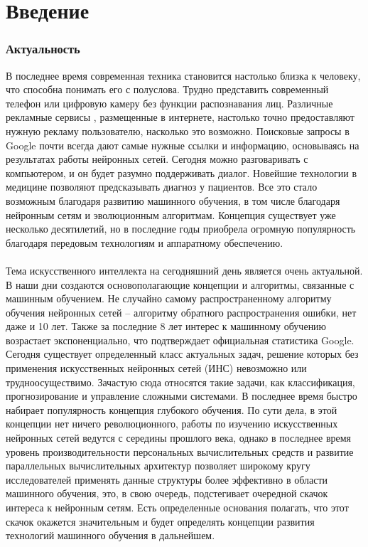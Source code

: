 \newpage

\chapter*{Введение}
\subsection*{Актуальность}
В последнее время современная техника становится настолько
близка к человеку, что способна понимать его с полуслова.
Трудно представить современный телефон или цифровую камеру
 без функции распознавания лиц. Различные рекламные сервисы
, размещенные в интернете, настолько точно предоставляют
нужную рекламу пользователю, насколько это возможно.  
Поисковые запросы в Google почти всегда дают самые нужные
 ссылки и информацию, основываясь на результатах работы нейронных 
 сетей. Сегодня можно разговаривать с компьютером, и он будет 
 разумно поддерживать диалог. Новейшие технологии в медицине 
 позволяют предсказывать диагноз у пациентов. Все это стало 
 возможным благодаря развитию машинного обучения, в том числе
  благодаря нейронным сетям и эволюционным алгоритмам. 
  Концепция существует уже несколько десятилетий, но в 
  последние годы приобрела огромную популярность благодаря
 передовым технологиям и аппаратному обеспечению. \\ \\
Тема искусственного интеллекта на сегодняшний день является 
очень актуальной. В наши дни создаются основополагающие 
концепции и алгоритмы, связанные с машинным обучением. 
Не случайно самому распространенному алгоритму обучения 
нейронных сетей – алгоритму обратного распространения 
ошибки, нет даже и 10 лет. Также за последние 8 лет интерес 
к машинному обучению возрастает экспоненциально, 
что подтверждает официальная статистика Google. 
Сегодня существует определенный класс актуальных задач, 
решение которых без применения искусственных нейронных 
сетей (ИНС) невозможно или трудноосуществимо. Зачастую 
сюда относятся такие задачи, как классификация, 
прогнозирование и управление сложными системами. 
В последнее время быстро набирает популярность 
концепция глубокого обучения. По сути дела, в этой 
концепции нет ничего революционного, работы по изучению 
искусственных нейронных сетей ведутся с середины прошлого
 века, однако в последнее время уровень производительности 
 персональных вычислительных средств и развитие параллельных 
 вычислительных архитектур позволяет широкому кругу 
 исследователей применять данные структуры более эффективно 
 в области машинного обучения, это, в свою очередь, 
 подстегивает очередной скачок интереса к нейронным сетям. 
 Есть определенные основания полагать, что этот скачок окажется 
 значительным и будет определять концепции развития технологий 
 машинного обучения в дальнейшем.

